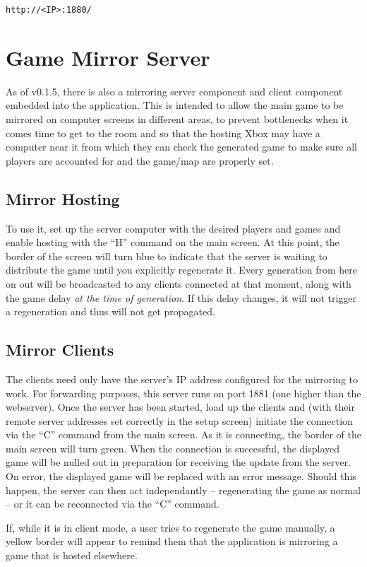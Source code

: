 \documentclass[10pt,a4paper]{report}
\begin{document}
\begin{verbatim}
http://<IP>:1880/
\end{verbatim}

\section{Game Mirror Server}
As of v0.1.5, there is also a mirroring server component and client component embedded into the application.  This is intended to allow the main game to be mirrored on computer screens in different areas, to prevent bottlenecks when it comes time to get to the room and so that the hosting Xbox may have a computer near it from which they can check the generated game to make sure all players are accounted for and the game/map are properly set.
\subsection{Mirror Hosting}
To use it, set up the server computer with the desired players and games and enable hosting with the ``H'' command on the main screen.  At this point, the border of the screen will turn blue to indicate that the server is waiting to distribute the game until you explicitly regenerate it.  Every generation from here on out will be broadcasted to any clients connected at that moment, along with the game delay \textit{at the time of generation}.  If this delay changes, it will not trigger a regeneration and thus will not get propagated.

\subsection{Mirror Clients}
The clients need only have the server's IP address configured for the mirroring to work.  For forwarding purposes, this server runs on port 1881 (one higher than the webserver).  Once the server has been started, load up the clients and (with their remote server addresses set correctly in the setup screen) initiate the connection via the ``C'' command from the main screen.  As it is connecting, the border of the main screen will turn green.  When the connection is successful, the displayed game will be nulled out in preparation for receiving the update from the server.  On error, the displayed game will be replaced with an error message.  Should this happen, the server can then act independantly -- regenerating the game as normal -- or it can be reconnected via the ``C'' command.

If, while it is in client mode, a user tries to regenerate the game manually, a yellow border will appear to remind them that the application is mirroring a game that is hosted elsewhere.
\end{document}
